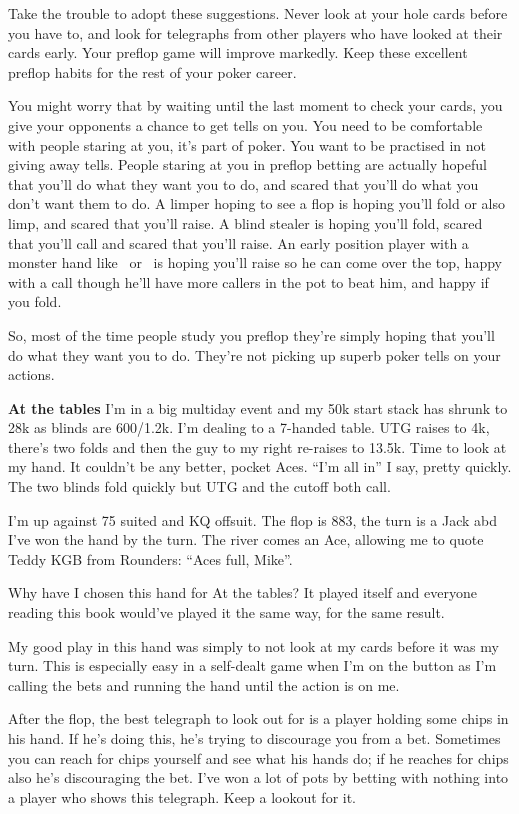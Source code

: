 Take the trouble to adopt these suggestions. Never look at your hole
cards before you have to, and look for telegraphs from other players
who have looked at their cards early. Your preflop game will
improve markedly. Keep these excellent preflop habits
for the rest of your poker career.

You might worry that by waiting until the last moment to check your
cards, you give your opponents a chance to get tells on you.
You need to be comfortable with people staring at you, it's part of
poker. You want to be practised in not giving away tells. People
staring at you in preflop betting are actually hopeful that you'll do
what they want you to do, and scared that you'll do what you don't
want them to do. A limper hoping to see a flop is hoping you'll fold
or also limp, and scared that you'll raise. A blind stealer is hoping
you'll fold, scared that you'll call and scared that you'll
raise. An early position player with a monster hand like \Kc\Ks\ or
\Ad\Kd\ is hoping you'll raise so he can come over the top, happy with
a call though he'll have more callers in the pot to beat him, and
happy if you fold.

So, most of the time people study you preflop they're simply
hoping that you'll do what they want you to do. They're not picking up
superb poker tells on your actions.

\textbf{At the tables} I'm in a big multiday event and my 50k start
stack has shrunk to 28k as blinds are 600/1.2k. I'm dealing to a
7-handed table. UTG raises to 4k, there's two folds and then the guy
to my right re-raises to 13.5k. Time to look at my hand. It couldn't
be any better, pocket Aces. ``I'm all in'' I say, pretty quickly. The
two blinds fold quickly but UTG and the cutoff both call.

I'm up against 75 suited and KQ offsuit. The flop is 883, the turn is
a Jack abd I've won the hand by the turn. The river comes an Ace,
allowing me to quote Teddy KGB from Rounders: ``Aces full, Mike''.

Why have I chosen this hand for At the tables? It played itself and
everyone reading this book would've played it the same way, for the
same result.

My good play in this hand was simply to not look at my cards before it
was my turn. This is especially easy in a self-dealt game when I'm on
the button as I'm calling the bets and running the hand until the
action is on me.

After the flop, the best telegraph to look out for is a player
holding some chips in his hand. If he's doing this, he's trying
to discourage you from a bet. Sometimes you can reach for chips
yourself and see what his hands do; if he reaches for chips also
he's discouraging the bet. I've won a lot of pots by betting
with nothing into a player who shows this telegraph. Keep a
lookout for it.

